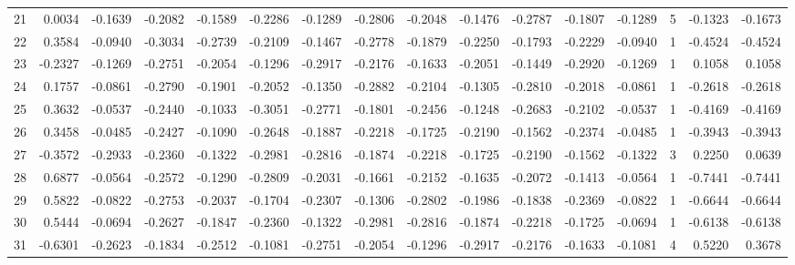 \begin{tabular}{lrrrrrrrrrrrrrrr}
21  &      0.0034 & -0.1639 & -0.2082 & -0.1589 & -0.2286 & -0.1289 & -0.2806 & -0.2048 & -0.1476 & -0.2787 &  -0.1807 &    -0.1289 &      5 &                   -0.1323 &                    -0.1673 \\
22  &      0.3584 & -0.0940 & -0.3034 & -0.2739 & -0.2109 & -0.1467 & -0.2778 & -0.1879 & -0.2250 & -0.1793 &  -0.2229 &    -0.0940 &      1 &                   -0.4524 &                    -0.4524 \\
23  &     -0.2327 & -0.1269 & -0.2751 & -0.2054 & -0.1296 & -0.2917 & -0.2176 & -0.1633 & -0.2051 & -0.1449 &  -0.2920 &    -0.1269 &      1 &                    0.1058 &                     0.1058 \\
24  &      0.1757 & -0.0861 & -0.2790 & -0.1901 & -0.2052 & -0.1350 & -0.2882 & -0.2104 & -0.1305 & -0.2810 &  -0.2018 &    -0.0861 &      1 &                   -0.2618 &                    -0.2618 \\
25  &      0.3632 & -0.0537 & -0.2440 & -0.1033 & -0.3051 & -0.2771 & -0.1801 & -0.2456 & -0.1248 & -0.2683 &  -0.2102 &    -0.0537 &      1 &                   -0.4169 &                    -0.4169 \\
26  &      0.3458 & -0.0485 & -0.2427 & -0.1090 & -0.2648 & -0.1887 & -0.2218 & -0.1725 & -0.2190 & -0.1562 &  -0.2374 &    -0.0485 &      1 &                   -0.3943 &                    -0.3943 \\
27  &     -0.3572 & -0.2933 & -0.2360 & -0.1322 & -0.2981 & -0.2816 & -0.1874 & -0.2218 & -0.1725 & -0.2190 &  -0.1562 &    -0.1322 &      3 &                    0.2250 &                     0.0639 \\
28  &      0.6877 & -0.0564 & -0.2572 & -0.1290 & -0.2809 & -0.2031 & -0.1661 & -0.2152 & -0.1635 & -0.2072 &  -0.1413 &    -0.0564 &      1 &                   -0.7441 &                    -0.7441 \\
29  &      0.5822 & -0.0822 & -0.2753 & -0.2037 & -0.1704 & -0.2307 & -0.1306 & -0.2802 & -0.1986 & -0.1838 &  -0.2369 &    -0.0822 &      1 &                   -0.6644 &                    -0.6644 \\
30  &      0.5444 & -0.0694 & -0.2627 & -0.1847 & -0.2360 & -0.1322 & -0.2981 & -0.2816 & -0.1874 & -0.2218 &  -0.1725 &    -0.0694 &      1 &                   -0.6138 &                    -0.6138 \\
31  &     -0.6301 & -0.2623 & -0.1834 & -0.2512 & -0.1081 & -0.2751 & -0.2054 & -0.1296 & -0.2917 & -0.2176 &  -0.1633 &    -0.1081 &      4 &                    0.5220 &                     0.3678 \\

\end{tabular}
